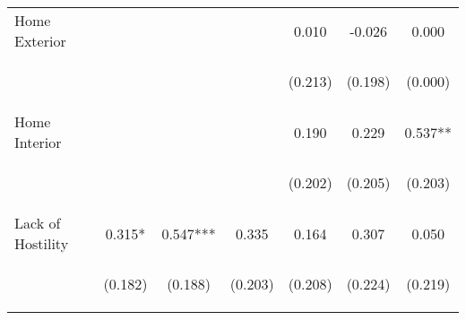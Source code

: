 \begin{tabular}{lcccccc}
\noalign{\smallskip}Home Exterior &  &  &  & 0.010 & -0.026 & 0.000\\
 & \begin{footnotesize}\end{footnotesize} & \begin{footnotesize}\end{footnotesize} & \begin{footnotesize}\end{footnotesize} & \begin{footnotesize}(0.213)\end{footnotesize} & \begin{footnotesize}(0.198)\end{footnotesize} & \begin{footnotesize}(0.000)\end{footnotesize}\\
\noalign{\smallskip}Home Interior &  &  &  & 0.190 & 0.229 & 0.537**\\
 & \begin{footnotesize}\end{footnotesize} & \begin{footnotesize}\end{footnotesize} & \begin{footnotesize}\end{footnotesize} & \begin{footnotesize}(0.202)\end{footnotesize} & \begin{footnotesize}(0.205)\end{footnotesize} & \begin{footnotesize}(0.203)\end{footnotesize}\\
\noalign{\smallskip}Lack of Hostility & 0.315* & 0.547*** & 0.335 & 0.164 & 0.307 & 0.050\\
 & \begin{footnotesize}(0.182)\end{footnotesize} & \begin{footnotesize}(0.188)\end{footnotesize} & \begin{footnotesize}(0.203)\end{footnotesize} & \begin{footnotesize}(0.208)\end{footnotesize} & \begin{footnotesize}(0.224)\end{footnotesize} & \begin{footnotesize}(0.219)\end{footnotesize}\\

\end{tabular}
